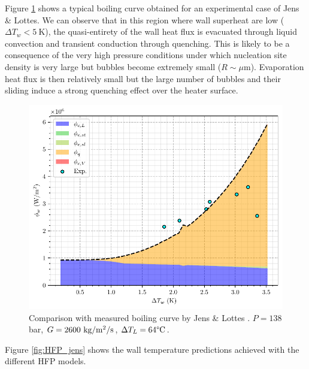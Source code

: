 Figure \ref{fig:HFP_jens_BC} shows a typical boiling curve obtained for an experimental case of Jens \& Lottes. We can observe that in this region where wall superheat are low ($\Delta T_{w}<5\ $K), the quasi-entirety of the wall heat flux is evacuated through liquid convection and transient conduction through quenching. This is likely to be a consequence of the very high pressure conditions under which nucleation site density is very large but bubbles become extremely small ($R \sim \mu$m). Evaporation heat flux is then relatively small but the large number of bubbles and their sliding induce a strong quenching effect over the heater surface. 

\npar

\begin{figure}[!h]
\centering
\includegraphics[width=0.6\linewidth]{img/HFP/jens/jens_p138.pdf}
\caption{Comparison with measured boiling curve by Jens \& Lottes \cite{jens_analysis_1951}. $P=138$ bar, $G=2600~\text{kg/m$^{2}$/s}$, $\Delta T_{L}=64\degree\mathrm{C}$.}
\label{fig:HFP_jens_BC}
\end{figure}
\npar

Figure \ref{fig:HFP_jens} shows the wall temperature predictions achieved with the different HFP models.

